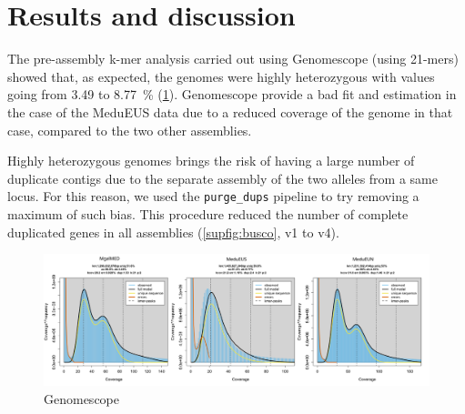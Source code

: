 \documentclass[11pt, a4paper]{article}
\begin{document}


\section{Results and discussion}

The pre-assembly k-mer analysis carried out using Genomescope (using 21-mers) showed that, as expected, the genomes were highly heterozygous with values going from 3.49 to 8.77~\% (\cref{fig:genomescope}).
Genomescope provide a bad fit and estimation in the case of the MeduEUS data due to a reduced coverage of the genome in that case, compared to the two other assemblies.

Highly heterozygous genomes brings the risk of having a large number of duplicate contigs due to the separate assembly of the two alleles from a same locus.
For this reason, we used the \texttt{purge\_dups} pipeline to try removing a maximum of such bias.
This procedure reduced the number of complete duplicated genes in all assemblies (\cref{supfig:busco}, v1 to v4).

\begin{figure}[h]
	\includegraphics[width=\linewidth]{figures/Fig1_genomescope.pdf}
	\caption{Genomescope}
	\label{fig:genomescope}
\end{figure}
\end{document}
